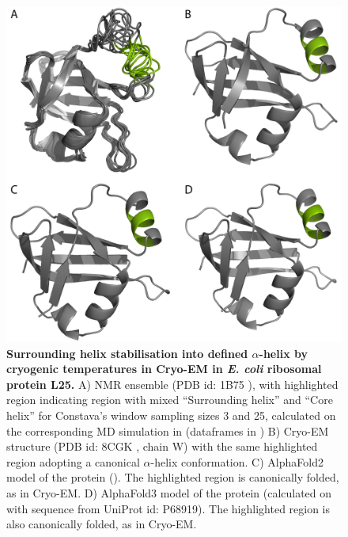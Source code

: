 \begin{figure}[htb!]
    \centering
    \includegraphics[width=0.85\linewidth]{figures/surrounding_notin_cryo.pdf}
    \caption{\textbf{Surrounding helix stabilisation into defined $\alpha$-helix by cryogenic temperatures in Cryo-EM in \textit{E. coli} ribosomal protein L25.} A) NMR ensemble (PDB id: 1B75 \cite{stoldt_nmr_1998}), with highlighted region indicating region with mixed ``Surrounding helix'' and ``Core helix'' for Constava's window sampling sizes 3 and 25, calculated on the corresponding MD simulation in \cite{gavalda-garcia_data-driven_2024} (dataframes in ) 
    B) Cryo-EM structure (PDB id: 8CGK \cite{paternoga_structural_2023}, chain W) with the same highlighted region adopting a canonical $\alpha$-helix conformation. 
    C) AlphaFold2 model of the protein (). The highlighted region is canonically folded, as in Cryo-EM. 
    D) AlphaFold3 model of the protein (calculated on  with sequence from UniProt id: P68919). The highlighted region is also canonically folded, as in Cryo-EM. 
    }
    \label{fig:discussion:surrhelix_vs_xray}
\end{figure}

